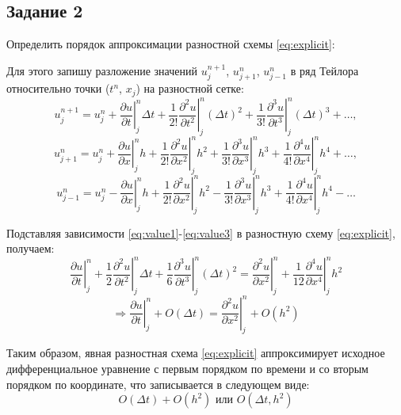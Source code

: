\documentclass[12pt, a4paper]{report}
\begin{document}
	\subsection*{Задание 2}
	\large
	Определить порядок аппроксимации разностной схемы \eqref{eq:explicit}: \par
	Для этого запишу разложение значений $u_{j}^{n+1}$, $u_{j+1}^{n}$, $u_{j-1}^{n}$ в ряд Тейлора относительно точки ($t^{n}$, $x_{j}$) на разностной сетке:
	\begin{equation}\label{eq:value1}
		u_{j}^{n+1} = u_{j}^{n} + \left.\frac{\partial u}{\partial t}\right|_{j}^{n}\Delta t + \left.\frac{1}{2!}\frac{\partial^{2} u}{\partial t^{2}}\right|_{j}^{n}(\Delta t)^{2} + \left.\frac{1}{3!}\frac{\partial^{3} u}{\partial t^{3}}\right|_{j}^{n}(\Delta t)^{3} + \dots,
	\end{equation}
	\begin{equation}\label{eq:value2}
		u_{j+1}^{n} = u_{j}^{n} + \left.\frac{\partial u}{\partial x}\right|_{j}^{n}h + \left.\frac{1}{2!}\frac{\partial^{2} u}{\partial x^{2}}\right|_{j}^{n}h^{2} + \left.\frac{1}{3!}\frac{\partial^{3} u}{\partial x^{3}}\right|_{j}^{n}h^{3} + \left.\frac{1}{4!}\frac{\partial^{4} u}{\partial x^{4}}\right|_{j}^{n}h^{4} + \dots,
	\end{equation}
	\begin{equation}\label{eq:value3}
		u_{j-1}^{n} = u_{j}^{n} - \left.\frac{\partial u}{\partial x}\right|_{j}^{n}h + \left.\frac{1}{2!}\frac{\partial^{2} u}{\partial x^{2}}\right|_{j}^{n}h^{2} - \left.\frac{1}{3!}\frac{\partial^{3} u}{\partial x^{3}}\right|_{j}^{n}h^{3} + \left.\frac{1}{4!}\frac{\partial^{4} u}{\partial x^{4}}\right|_{j}^{n}h^{4} - \dots
	\end{equation}
	\par
	Подставляя зависимости \eqref{eq:value1}-\eqref{eq:value3} в разностную схему \eqref{eq:explicit}, получаем:
	\begin{equation*}
		\left.\frac{\partial u}{\partial t}\right|_{j}^{n} + \left.\frac{1}{2}\frac{\partial^{2} u}{\partial t^{2}}\right|_{j}^{n}\Delta t + \left.\frac{1}{6}\frac{\partial^{3} u}{\partial t^{3}}\right|_{j}^{n}(\Delta t)^{2} = \left.\frac{\partial^{2} u}{\partial x^{2}}\right|_{j}^{n} + \left.\frac{1}{12}\frac{\partial^{4} u}{\partial x^{4}}\right|_{j}^{n}h^{2}
	\end{equation*}
	\begin{equation*}
		\Rightarrow \left.\frac{\partial u}{\partial t}\right|_{j}^{n} + O(\Delta t) = \left.\frac{\partial^{2} u}{\partial x^{2}}\right|_{j}^{n} + O(h^{2})
	\end{equation*}
	\par
	Таким образом, явная разностная схема \eqref{eq:explicit} аппроксимирует исходное дифференциальное уравнение с первым порядком по времени и со вторым порядком по координате, что записывается в следующем виде:
	\begin{equation*}
		O(\Delta t) + O(h^{2}) \text{ или } O(\Delta t, h^{2})	
	\end{equation*}
\end{document}
